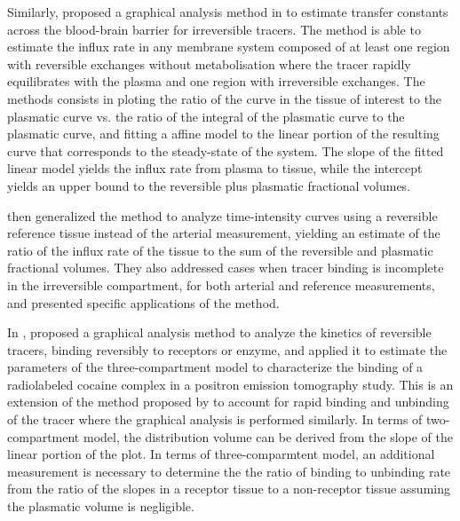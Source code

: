 Similarly, \citet{Patlak:1983id} proposed a graphical analysis method in \citeyear{Patlak:1983id} to estimate transfer constants across the blood-brain barrier for irreversible tracers.
The method is able to estimate the influx rate in any membrane system composed of at least one region with reversible exchanges without metabolisation where the tracer rapidly equilibrates with the plasma and one region with irreversible exchanges.
The methods consists in ploting the ratio of the curve in the tissue of interest to the plasmatic curve vs. the ratio of the integral of the plasmatic curve to the plasmatic curve, and fitting a affine model to the linear portion of the resulting curve that corresponds to the steady-state of the system.
The slope of the fitted linear model yields the influx rate from plasma to tissue, while the intercept yields an upper bound to the reversible plus plasmatic fractional volumes.

\citet{Patlak:1985bc} then generalized the method to analyze time-intensity curves using a reversible reference tissue instead of the arterial measurement, yielding an estimate of the ratio of the influx rate of the tissue to the sum of the reversible and plasmatic fractional volumes.
They also addressed cases when tracer binding is incomplete in the irreversible compartment, for both arterial and reference measurements, and presented specific applications of the method.

In \citeyear{Logan:1990jg}, \citet{Logan:1990jg} proposed a graphical analysis method to analyze the kinetics of reversible tracers, binding reversibly to receptors or enzyme, and applied it to estimate the parameters of the three-compartment model to characterize the binding of a radiolabeled cocaine complex in a positron emission tomography study.
This is an extension of the method proposed by \citet{Gjedde:1981ge} to account for rapid binding and unbinding of the tracer where the graphical analysis is performed similarly.
In terms of two-compartment model, the distribution volume can be derived from the slope of the linear portion of the plot.
In terms of three-comparmtent model, an additional measurement is necessary to determine the the ratio of binding to unbinding rate from the ratio of the slopes in a receptor tissue to a non-receptor tissue assuming the plasmatic volume is negligible. 

